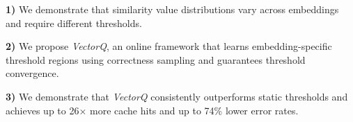 \textbf{1)}  We demonstrate that similarity value distributions vary across embeddings and require different thresholds.

\textbf{2)} We propose \textit{VectorQ}, an online framework that learns embedding-specific threshold regions using correctness sampling and guarantees threshold convergence.

\textbf{3)} We demonstrate that \textit{VectorQ} consistently outperforms static thresholds and achieves up to 26× more cache hits and up to 74\% lower error rates.
